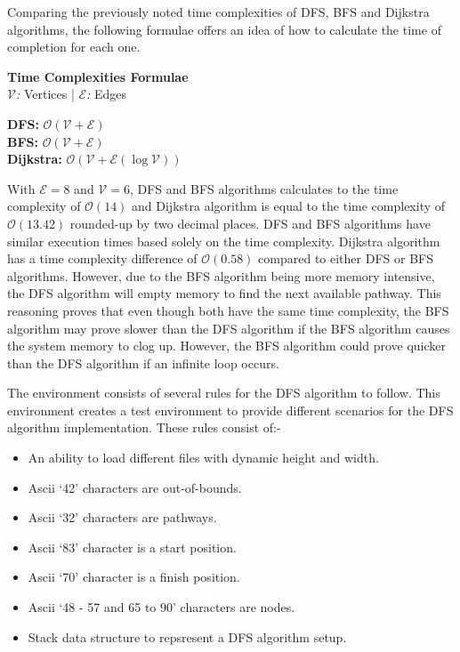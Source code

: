 \documentclass[conference]{IEEEtran}
\begin{document}
      Comparing the previously noted time complexities of DFS, BFS and Dijkstra algorithms, the following formulae offers an idea of how to calculate the time of completion for each one.
      \begin{center}
        \textbf{Time Complexities Formulae}\\
        \textit{$\mathcal{V}$:} Vertices | \textit{$\mathcal{E}$:} Edges

        \textbf{DFS:} $\mathcal{O}(\mathcal{V} + \mathcal{E})$\\
        \textbf{BFS:} $\mathcal{O}(\mathcal{V} + \mathcal{E})$\\
        \textbf{Dijkstra:} $\mathcal{O}(\mathcal{V} + \mathcal{E}(\log\mathcal{V}))$
      \end{center}

      With ${\mathcal{E} = 8}$ and $\mathcal{V} = 6$, DFS and BFS algorithms calculates to the time complexity of $\mathcal{O}(14)$ and Dijkstra algorithm is equal to the time complexity of $\mathcal{O}(13.42)$ rounded-up by two decimal places. DFS and BFS algorithms have similar execution times based solely on the time complexity. Dijkstra algorithm has a time complexity difference of $\mathcal{O}(0.58)$ compared to either DFS or BFS algorithms. However, due to the BFS algorithm being more memory intensive, the DFS algorithm will empty memory to find the next available pathway. This reasoning proves that even though both have the same time complexity, the BFS algorithm may prove slower than the DFS algorithm if the BFS algorithm causes the system memory to clog up. However, the BFS algorithm could prove quicker than the DFS algorithm if an infinite loop occurs.

      The environment consists of several rules for the DFS algorithm to follow. This environment creates a test environment to provide different scenarios for the DFS algorithm implementation. These rules consist of:-
      \begin{itemize}
        \item An ability to load different files with dynamic height and width.
        \item Ascii `42' characters are out-of-bounds.
        \item Ascii `32' characters are pathways.
        \item Ascii `83' character is a start position.
        \item Ascii `70' character is a finish position.
        \item Ascii `48 - 57 and 65 to 90' characters are nodes.
        \item Stack data structure to repsresent a DFS algorithm setup.
      \end{itemize}
\end{document}
